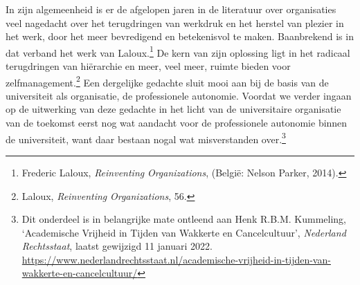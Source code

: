 \documentclass[smallauthor, chapterhaspagenum, nochapterinheader, pagenuminheader,  bigchapnum,medium2, tocpages,  garamond, titleinheader]{jote-book}
\begin{document}
	In zijn algemeenheid is er de afgelopen jaren in de literatuur over organisaties veel nagedacht over het terugdringen van werkdruk en het herstel van plezier in het werk, door het meer bevredigend en betekenisvol te maken. Baanbrekend is in dat verband het werk van Laloux.\footnote{Frederic Laloux, \emph{Reinventing}\emph{ }\emph{Organizations}, (België: Nelson Parker, 2014).} De kern van zijn oplossing ligt in het radicaal terugdringen van hiërarchie en meer, veel meer, ruimte bieden voor zelfmanagement.\footnote{Laloux, \emph{Reinventing}\emph{ }\emph{Organizations}, 56.} Een dergelijke gedachte sluit mooi aan bij de basis van de universiteit als organisatie, de professionele autonomie. Voordat we verder ingaan op de uitwerking van deze gedachte in het licht van de universitaire organisatie van de toekomst eerst nog wat aandacht voor de professionele autonomie binnen de universiteit, want daar bestaan nogal wat misverstanden over.\footnote{Dit onderdeel is in belangrijke mate ontleend aan Henk R.B.M. Kummeling, ‘Academische Vrijheid in Tijden van Wakkerte en Cancelcultuur', \emph{Nederland Rechtsstaat}, laatst gewijzigd 11 januari 2022. \href{https://www.nederlandrechtsstaat.nl/academische-vrijheid-in-tijden-van-wakkerte-en-cancelcultuur/}{https://www.nederlandrechtsstaat.nl/academische-vrijheid-in-tijden-van-wakkerte-en-cancelcultuur/}}
\end{document}
